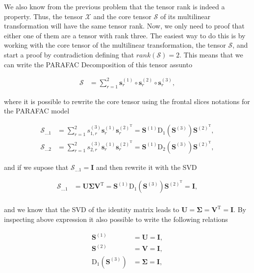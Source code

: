 \documentclass[a4paper,10pt]{article}
\begin{document}
\begin{enumerate}
        We also know from the previous problem that the tensor rank is indeed a property. Thus, the tensor $\mathcal{X}$ and the core tensor $\mathcal{S}$ of its multilinear transformation will have the same tensor rank.
        Now, we only need to proof that either one of them are a tensor with rank three. The easiest way to do this is by working with the core tensor of the multilinear transformation, the tensor $\mathcal{S}$, and start 
        a proof by contradiction defining that $rank(\mathcal{S}) = 2$. This means that we can write the PARAFAC Decomposition of this tensor assunto

        \begin{align}
            \mathcal{S} &= \sum^{2}_{r = 1} \boldsymbol{s}^{(1)}_{r} \circ \boldsymbol{s}^{(2)}_{r} \circ \boldsymbol{s}^{(3)}_{r},     
        \end{align}
        
        where it is possible to rewrite the core tensor using the frontal slices notations for the PARAFAC model

        \begin{align}
            \mathcal{S}_{...1} &= \sum^{2}_{r = 1} s^{(3)}_{1,r} \boldsymbol{s}^{(1)}_{r} \boldsymbol{s}^{(2)^{\text{T}}}_{r} = \boldsymbol{S}^{(1)} \text{D}_{1}\left(\boldsymbol{S}^{(3)}\right) \boldsymbol{S}^{(2)^{\text{T}}}, \\
            \mathcal{S}_{...2} &= \sum^{2}_{r = 1} s^{(3)}_{2,r} \boldsymbol{s}^{(1)}_{r} \boldsymbol{s}^{(2)^{\text{T}}}_{r} = \boldsymbol{S}^{(1)} \text{D}_{2}\left(\boldsymbol{S}^{(3)}\right) \boldsymbol{S}^{(2)^{\text{T}}}, 
        \end{align}

        and if we supose that $\mathcal{S}_{...1} = \boldsymbol{I}$ and then rewrite it with the SVD

        \begin{align}
            \mathcal{S}_{...1} &= \boldsymbol{U} \boldsymbol{\Sigma} \boldsymbol{V}^{\text{T}} = \boldsymbol{S}^{(1)} \text{D}_{1}\left(\boldsymbol{S}^{(3)}\right) \boldsymbol{S}^{(2)^{\text{T}}} = \boldsymbol{I}, \\
        \end{align}

        and we know that the SVD of the identity matrix leads to $\boldsymbol{U} = \boldsymbol{\Sigma} = \boldsymbol{V}^{\text{T}} = \boldsymbol{I}$. By inspecting above expression it also possible to write the following relations

        \begin{align}
            \boldsymbol{S}^{(1)} &= \boldsymbol{U} = \boldsymbol{I}, \\
            \boldsymbol{S}^{(2)} &= \boldsymbol{V} = \boldsymbol{I}, \\
            \text{D}_{1}\left(\boldsymbol{S}^{(3)}\right) &= \boldsymbol{\Sigma} = \boldsymbol{I}, 
        \end{align}


\end{enumerate}
\end{document}
